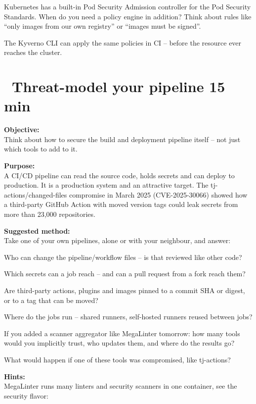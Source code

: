 \documentclass[a4paper,11pt,notitlepage]{report}
\begin{document}
Kubernetes has a built-in Pod Security Admission controller for the Pod Security Standards. When do you need a policy engine in addition? Think about rules like ``only images from our own registry'' or ``images must be signed''.

The Kyverno CLI can apply the same policies in CI -- before the resource ever reaches the cluster.


\chapter{\faExclamationTriangle\ Threat-model your pipeline 15 min}
\label{ex:pipeline-threat-model}

{\bf Objective:}\\
Think about how to secure the build and deployment pipeline itself -- not just which tools to add to it.

{\bf Purpose:}\\
A CI/CD pipeline can read the source code, holds secrets and can deploy to production. It is a production system and an attractive target. The tj-actions/changed-files compromise in March 2025 (CVE-2025-30066) showed how a third-party GitHub Action with moved version tags could leak secrets from more than 23,000 repositories.

{\bf Suggested method:}\\
Take one of your own pipelines, alone or with your neighbour, and answer:
\begin{list2}
\item Who can change the pipeline/workflow files -- is that reviewed like other code?
\item Which secrets can a job reach -- and can a pull request from a fork reach them?
\item Are third-party actions, plugins and images pinned to a commit SHA or digest, or to a tag that can be moved?
\item Where do the jobs run -- shared runners, self-hosted runners reused between jobs?
\item If you added a scanner aggregator like MegaLinter tomorrow: how many tools would you implicitly trust, who updates them, and where do the results go?
\item What would happen if one of these tools was compromised, like tj-actions?
\end{list2}

{\bf Hints:}\\
MegaLinter runs many linters and security scanners in one container, see the security flavor:\\
\end{document}
